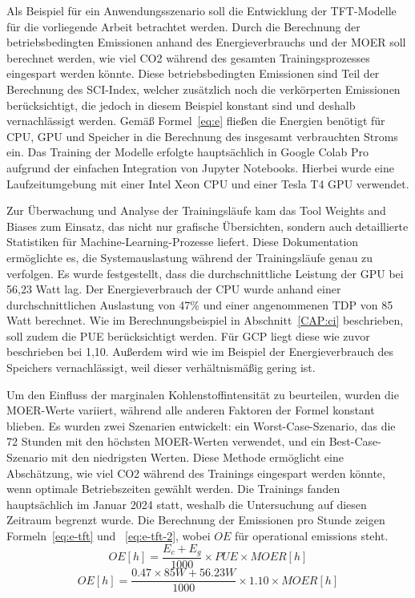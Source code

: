 Als Beispiel für ein Anwendungsszenario soll die Entwicklung der \ac{TFT}-Modelle für die vorliegende Arbeit betrachtet werden.
Durch die Berechnung der betriebsbedingten Emissionen anhand des Energieverbrauchs und der \ac{MOER} soll berechnet werden, wie viel \ac{CO2} während des gesamten Trainingsprozesses eingespart werden könnte.
Diese betriebsbedingten Emissionen sind Teil der Berechnung des \ac{SCI}-Index, welcher zusätzlich noch die verkörperten Emissionen berücksichtigt, die jedoch in diesem Beispiel konstant sind und deshalb vernachlässigt werden.
Gemäß Formel~\ref{eq:e} fließen die Energien benötigt für \ac{CPU}, \ac{GPU} und Speicher in die Berechnung des insgesamt verbrauchten Stroms ein.
Das Training der Modelle erfolgte hauptsächlich in Google Colab Pro aufgrund der einfachen Integration von Jupyter Notebooks.
Hierbei wurde eine Laufzeitumgebung mit einer Intel Xeon \ac{CPU} und einer Tesla T4 \ac{GPU} verwendet.

Zur Überwachung und Analyse der Trainingsläufe kam das Tool Weights and Biases zum Einsatz, das nicht nur grafische Übersichten, sondern auch detaillierte Statistiken für Machine-Learning-Prozesse liefert.
Diese Dokumentation ermöglichte es, die Systemauslastung während der Trainingsläufe genau zu verfolgen.
Es wurde festgestellt, dass die durchschnittliche Leistung der \ac{GPU} bei 56,23 Watt lag.
Der Energieverbrauch der \ac{CPU} wurde anhand einer durchschnittlichen Auslastung von 47\% und einer angenommenen \ac{TDP} von 85 Watt berechnet.
Wie im Berechnungsbeispiel in Abschnitt~\ref{CAP:ci} beschrieben, soll zudem die \ac{PUE} berücksichtigt werden.
Für \ac{GCP} liegt diese wie zuvor beschrieben bei 1,10.
Außerdem wird wie im Beispiel der Energieverbrauch des Speichers vernachlässigt, weil dieser verhältnismäßig gering ist.

Um den Einfluss der marginalen Kohlenstoffintensität zu beurteilen, wurden die \ac{MOER}-Werte variiert, während alle anderen Faktoren der Formel konstant blieben.
Es wurden zwei Szenarien entwickelt: ein Worst-Case-Szenario, das die 72 Stunden mit den höchsten \ac{MOER}-Werten verwendet, und ein Best-Case-Szenario mit den niedrigsten Werten.
Diese Methode ermöglicht eine Abschätzung, wie viel \ac{CO2} während des Trainings eingespart werden könnte, wenn optimale Betriebszeiten gewählt werden.
Die Trainings fanden hauptsächlich im Januar 2024 statt, weshalb die Untersuchung auf diesen Zeitraum begrenzt wurde.
Die Berechnung der Emissionen pro Stunde zeigen Formeln~\ref{eq:e-tft} und ~\ref{eq:e-tft-2}, wobei $OE$ für \glqq operational emissions \grqq{} steht.
\begin{equation}
 \label{eq:e-tft}
 OE[h] = \frac{E_c + E_g}{1000} \times PUE \times MOER[h]
\end{equation}
\begin{equation}
 \label{eq:e-tft-2}
 OE[h] = \frac{0.47 \times 85W + 56.23W}{1000} \times 1.10 \times MOER[h]
\end{equation}

